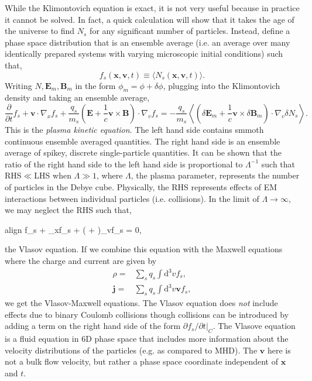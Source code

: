 	While the Klimontovich equation is exact, it is not very useful because in practice it cannot be solved. In fact, a quick calculation will show that it takes the age of the universe to find $N_s$ for any significant number of particles. Instead, define a phase space distribution that is an ensemble average (i.e. an average over many identically prepared systems with varying microscopic initial conditions) such that,
	\begin{equation}
		f_s(\mathbf{x},\mathbf{v},t) \equiv \langle N_s(\mathbf{x},\mathbf{v},t)\rangle.
	\end{equation}
	Writing $N,\mathbf{E}_m,\mathbf{B}_m$ in the form $\phi_m = \phi + \delta\phi$, plugging into the Klimontovich density and taking an ensemble average, 
	\begin{equation}
		\frac{\partial}{\partial t}f_s + \mathbf{v}\cdot\nabla_xf_s + \frac{q_s}{m_s}\left(\mathbf{E} + \frac{1}{c}\mathbf{v}\times\mathbf{B}\right)\cdot\nabla_vf_s = -\frac{q_s}{m_s}\left\langle\left(\delta\mathbf{E}_m + \frac{1}{c}\mathbf{v}\times\delta\mathbf{B}_m\right)\cdot\nabla_v\delta N_s\right\rangle.
	\end{equation}
	This is the \textit{plasma kinetic equation}. The left hand side contains smmoth continuous ensemble averaged quantities. The right hand side is an ensemble average of spikey, discrete single-particle quantities. It can be shown that the ratio of the right hand side to the left hand side is proportional to $\Lambda^{-1}$ such that RHS$\ll$LHS when $\Lambda\gg1$, where $\Lambda$, the plasma parameter, represents the number of particles in the Debye cube. Physically, the RHS represents effects of EM interactions between individual particles (i.e. collisions). In the limit of $\Lambda\to\infty$, we may neglect the RHS such that,
	\begin{empheq}[box=\widefbox]{align}
		f_s + \cdot\nabla_xf_s + \left( + \times{}\right)\cdot\nabla_vf_s = 0,
	\end{empheq}
	the Vlasov equation. If we combine this equation with the Maxwell equations where the charge and current are given by
	\begin{align}
		\rho =& \sum_sq_s\int\mathrm{d}^3vf_s, \\
		\mathbf{j} =& \sum_sq_s\int\mathrm{d}^3v\mathbf{v}f_s,
	\end{align}
	we get the Vlasov-Maxwell equations. The Vlasov equation does \textit{not} include effects due to binary Coulomb collisions though collisions can be introduced by adding a term on the right hand side of the form $\partial f_s/\partial t|_C$. The Vlasove equation is a fluid equation in 6D phase space that includes more information about the velocity distributions of the particles (e.g. as compared to MHD). The $\mathbf{v}$ here is not a bulk flow velocity, but rather a phase space coordinate independent of $\mathbf{x}$ and $t$. 

